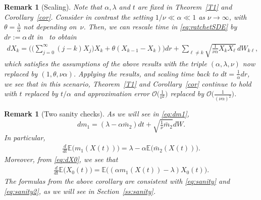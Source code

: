 \documentclass{imsart}
\theoremstyle{plain}
\newtheorem{remark}[theorem]{Remark}
\theoremstyle{definition}
\begin{document}
\begin{remark}[Scaling]
    \label{rem:scaling}
    Note that $\alpha, \lambda$ and $t$ are fixed in Theorem~\ref{T1} and Corollary~\ref{cor}. Consider in contrast the setting $1/\nu \ll \alpha \ll  1$ as $\nu \to \infty$, with $\theta = \frac \lambda \alpha$ not depending on~$\nu$. Then, we can rescale time in \eqref{eq:ratchetSDE} by $dr := \alpha \, dt$ in \, to obtain
    \begin{align}
        \label{eq:ratchetSDEscaling}
    d X_k = \Big( \Big(\sum_{j=0}^\infty (j-k)X_j\Big) X_k + \theta(X_{k-1} - X_k)\Big)dr + \sum_{\ell \neq k}\sqrt{\frac 1{\nu\alpha} X_k X_\ell} \, dW_{k\ell}, \qquad \tag{$\ast_s$}
    \end{align}
    which satisfies the assumptions of the above results with the triple $(\alpha, \lambda, \nu)$ now replaced by  $(1, \theta, \nu \alpha)$. Applying the results, and scaling time back to $dt = \tfrac{1}{\alpha} dr$, we see that in this scenario, Theorem~\ref{T1} and Corollary~\ref{cor} continue to hold with $t$ replaced by $t/\alpha$ and approximation error $\mathcal O\big( \frac{1}{\nu^2}\big)$ replaced by $\mathcal O\big( \frac{1}{(\nu \alpha)^2}\big)$.
\end{remark}

\begin{remark}[Two sanity checks]
\label{rem:sanity}
As we will see in \eqref{eq:dm1}, 
$$ dm_1 = (\lambda - \alpha \bar m_2) dt + \sqrt{\tfrac 1\nu \bar m_2}dW. $$
In particular, 
\begin{align}
\label{eq:sanity}
\frac{d}{dt }\mathbb E\big(m_1(X(t) )\big)
=
\lambda-\alpha\mathbb E\big(\bar m_2(X(t) )\big).
\end{align}
Moreover, from \eqref{eq:dX0}, we see that
\begin{align}
\label{eq:sanity2}
\frac{d}{dt } \mathbb E\big(X_0(t )\big) = \mathbb E\big((\alpha m_1(X(t) ) - \lambda)X_0(t )\big).
\end{align}
The formulas from the above corollary are consistent with \eqref{eq:sanity} and \eqref{eq:sanity2}, as we will see in Section~\ref{ss:sanity}.
\end{remark}
\end{document}
